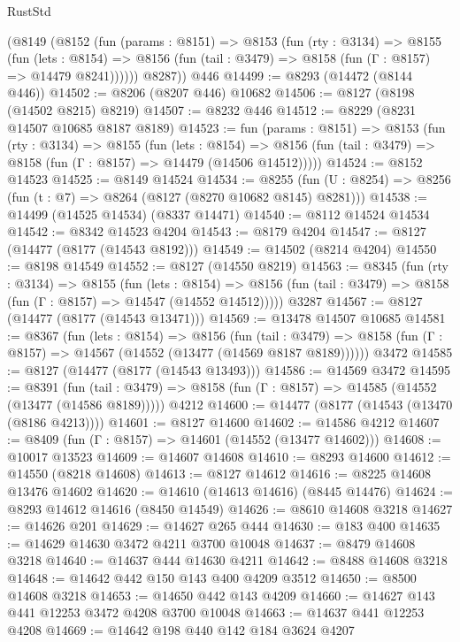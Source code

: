 \begin{lexlean}{RustStd}
\begin{coremodule}
      (@8149
        (@8152
          (fun (params : @8151) =>
          @8153
            (fun (rty : @3134) =>
            @8155
              (fun (lets : @8154) =>
              @8156 (fun (tail : @3479) => @8158 (fun (Γ : @8157) => @14479 @8241))))))
        @8287))
    @446
@14499 := @8293 (@14472 (@8144 @446))
@14502 := @8206 (@8207 @446) @10682
@14506 := @8127 (@8198 (@14502 @8215) @8219)
@14507 := @8232 @446
@14512 := @8229 (@8231 @14507 @10685 @8187 @8189)
@14523 := fun (params : @8151) =>
  @8153
    (fun (rty : @3134) =>
    @8155
      (fun (lets : @8154) =>
      @8156 (fun (tail : @3479) => @8158 (fun (Γ : @8157) => @14479 (@14506 @14512)))))
@14524 := @8152 @14523
@14525 := @8149 @14524
@14534 := @8255
    (fun (U : @8254) => @8256 (fun (t : @7) => @8264 (@8127 (@8270 @10682 @8145) @8281)))
@14538 := @14499 (@14525 @14534) (@8337 @14471)
@14540 := @8112 @14524 @14534
@14542 := @8342 @14523 @4204
@14543 := @8179 @4204
@14547 := @8127 (@14477 (@8177 (@14543 @8192)))
@14549 := @14502 (@8214 @4204)
@14550 := @8198 @14549
@14552 := @8127 (@14550 @8219)
@14563 := @8345
    (fun (rty : @3134) =>
    @8155
      (fun (lets : @8154) =>
      @8156 (fun (tail : @3479) => @8158 (fun (Γ : @8157) => @14547 (@14552 @14512)))))
    @3287
@14567 := @8127 (@14477 (@8177 (@14543 @13471)))
@14569 := @13478 @14507 @10685
@14581 := @8367
    (fun (lets : @8154) =>
    @8156
      (fun (tail : @3479) =>
      @8158 (fun (Γ : @8157) => @14567 (@14552 (@13477 (@14569 @8187 @8189))))))
    @3472
@14585 := @8127 (@14477 (@8177 (@14543 @13493)))
@14586 := @14569 @3472
@14595 := @8391
    (fun (tail : @3479) => @8158 (fun (Γ : @8157) => @14585 (@14552 (@13477 (@14586 @8189)))))
    @4212
@14600 := @14477 (@8177 (@14543 (@13470 (@8186 @4213))))
@14601 := @8127 @14600
@14602 := @14586 @4212
@14607 := @8409 (fun (Γ : @8157) => @14601 (@14552 (@13477 @14602)))
@14608 := @10017 @13523
@14609 := @14607 @14608
@14610 := @8293 @14600
@14612 := @14550 (@8218 @14608)
@14613 := @8127 @14612
@14616 := @8225 @14608 @13476 @14602
@14620 := @14610 (@14613 @14616) (@8445 @14476)
@14624 := @8293 @14612 @14616 (@8450 @14549)
@14626 := @8610 @14608 @3218
@14627 := @14626 @201
@14629 := @14627 @265 @444
@14630 := @183 @400
@14635 := @14629 @14630 @3472 @4211 @3700 @10048
@14637 := @8479 @14608 @3218
@14640 := @14637 @444 @14630 @4211
@14642 := @8488 @14608 @3218
@14648 := @14642 @442 @150 @143 @400 @4209 @3512
@14650 := @8500 @14608 @3218
@14653 := @14650 @442 @143 @4209
@14660 := @14627 @143 @441 @12253 @3472 @4208 @3700 @10048
@14663 := @14637 @441 @12253 @4208
@14669 := @14642 @198 @440 @142 @184 @3624 @4207

\end{coremodule}
\end{lexlean}
